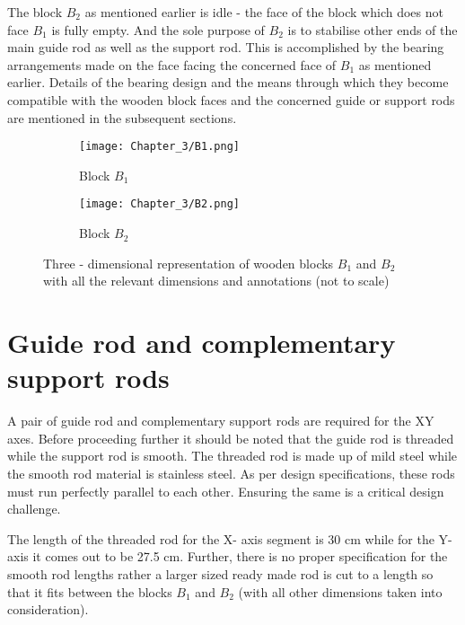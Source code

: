 The block $B_{2}$ as mentioned earlier is idle - the face of the block which does not face $B_{1}$ is fully empty. And the sole purpose of $B_{2}$ is to stabilise other ends of the main guide rod as well as the support rod. This is accomplished by the bearing arrangements made on the face facing the concerned face of $B_{1}$ as mentioned earlier. Details of the bearing design and the means through which they become compatible with the wooden block faces and the concerned guide or support rods are mentioned in the subsequent sections.

\begin{figure}[h]

    \begin{subfigure}{0.5\textwidth}
    \hspace{8mm}
        \texttt{[image: Chapter\_3/B1.png]}
        \caption{Block $B_{1}$}
        \label{fig:b1}
    \end{subfigure}
    \begin{subfigure}{0.5\textwidth}
    \hspace{8mm}
        \texttt{[image: Chapter\_3/B2.png]}
        \caption{Block $B_{2}$}
        \label{fig:b2}
    \end{subfigure}

    \caption{Three - dimensional representation of wooden blocks $B_{1}$ and $B_{2}$ with all the relevant dimensions and annotations (not to scale)}
    \label{fig:b1b2}
    \end{figure}


\section{Guide rod and complementary support rods}

A pair of guide rod and complementary support rods are required for the XY axes. Before proceeding further it should be noted that the guide rod is threaded while the support rod is smooth. The threaded rod is made up of mild steel while the smooth rod material is stainless steel. As per design specifications, these rods must run perfectly parallel to each other. Ensuring the same is a critical design challenge. \par

The length of the threaded rod for the X- axis segment is 30 cm while for the Y- axis it comes out to be 27.5 cm. Further, there is no proper specification for the smooth rod lengths rather a larger sized ready made rod is cut to a length so that it fits between the blocks $B_{1}$ and $B_{2}$ (with all other dimensions taken into consideration). \par

